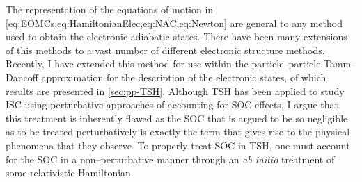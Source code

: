 The representation of the equations of motion in
\cref{eq:EOMCs,eq:HamiltonianElec,eq:NAC,eq:Newton} are general to any method
used to obtain the electronic adiabatic states. There have been many extensions
of this methods to a vast number of different electronic structure methods.
Recently, I have extended this method for use within the particle--particle
Tamm--Dancoff approximation for the description of the electronic
states\cite{DBWY16_Submitted1}, of which results are presented in
\cref{sec:pp-TSH}. Although TSH has been applied to study ISC using perturbative
approaches of accounting for SOC effects, I argue that this treatment is
inherently flawed as the SOC that is argued to be so negligible as to be treated
perturbatively is exactly the term that gives rise to the physical phenomena
that they observe. To properly treat SOC in TSH, one must account for the SOC in
a non--perturbative manner through an \emph{ab initio} treatment of some
relativistic Hamiltonian.

